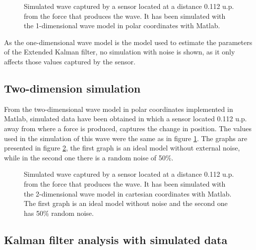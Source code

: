 \documentclass[12pt, a4paper]{article} %
\begin{document}
\setlength{\parskip}{4mm}

\begin{figure}[htbp]
    \centering
    
    \caption{Simulated wave captured by a sensor located at a distance 0.112 u.p. from the force that produces the wave. It has been simulated with the 1-dimensional wave model in polar coordinates with Matlab.}
    \label{fig:modelo1}
\end{figure}

As the one-dimensional wave model is the model used to estimate the parameters of the Extended Kalman filter, no simulation with noise is shown, as it only affects those values captured by the sensor.

\newpage
\subsection{Two-dimension simulation}

\setlength{\parskip}{0mm}

From the two-dimensional wave model in polar coordinates implemented in Matlab, simulated data have been obtained in which a sensor located 0.112 u.p. away from where a force is produced, captures the change in position. The values used in the simulation of this wave were the same as in figure \ref{fig:modelo1}. The graphs are presented in figure \ref{fig:modelo2}, the first graph is an ideal model without external noise, while in the second one there is a random noise of 50\%.

\setlength{\parskip}{4mm}

\begin{figure}[h!]
    \centering
    
    \caption{Simulated wave captured by a sensor located at a distance 0.112 u.p. from the force that produces the wave. It has been simulated with the 2-dimensional wave model in cartesian coordinates with Matlab. The first graph is an ideal model without noise and the second one has 50\% random noise.}
    \label{fig:modelo2}
\end{figure}

\newpage
\subsection{Kalman filter analysis with simulated data}
\end{document}
